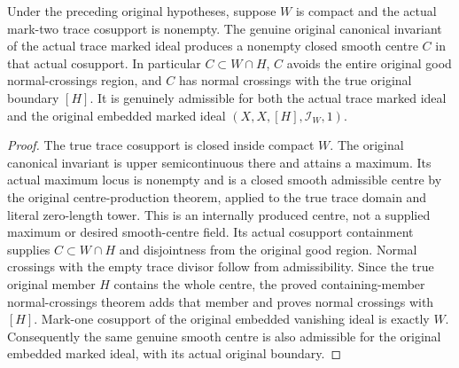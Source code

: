 \begin{theorem}
\label{hir:sharp-single-boundary-actual-modified-trace-centre}
\leanok
Under the preceding original hypotheses, suppose $W$ is compact and the
actual mark-two trace cosupport is nonempty. The genuine original
canonical invariant of the actual trace marked ideal produces a nonempty
closed smooth centre $C$ in that actual cosupport. In particular
$C\subset W\cap H$, $C$ avoids the entire original good normal-crossings
region, and $C$ has normal crossings with the true original boundary
$[H]$. It is genuinely admissible for both the actual trace marked ideal
and the original embedded marked ideal $(X,X,[H],\mathcal I_W,1)$.
\end{theorem}
\begin{proof}
The true trace cosupport is closed inside compact $W$. The original
canonical invariant is upper semicontinuous there and attains a maximum.
Its actual maximum locus is nonempty and is a closed smooth admissible
centre by the original centre-production theorem, applied to the true
trace domain and literal zero-length tower. This is an internally
produced centre, not a supplied maximum or desired smooth-centre field.
Its actual cosupport containment supplies $C\subset W\cap H$ and
disjointness from the original good region. Normal crossings with the
empty trace divisor follow from admissibility. Since the true original
member $H$ contains the whole centre, the proved containing-member
normal-crossings theorem adds that member and proves normal crossings
with $[H]$. Mark-one cosupport of the original embedded vanishing ideal
is exactly $W$. Consequently the same genuine smooth centre is also
admissible for the original embedded marked ideal, with its actual
original boundary.
\end{proof}

